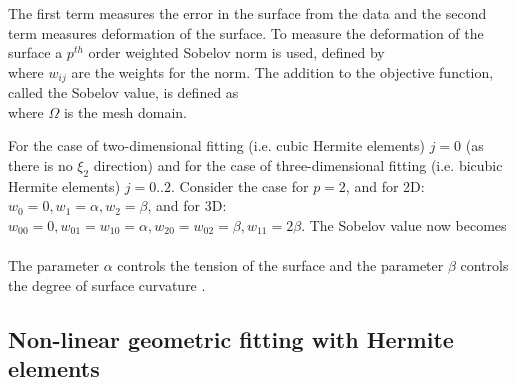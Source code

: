The first term measures the error in the surface from the data and the second
term measures deformation of the surface. To measure the deformation of the
surface a $p^{th}$ order weighted Sobelov norm 
\cite{terzopoulos:1986,tikhonov:1977} is used, defined by
\begin{equation}
  \label{eqn:Sobnorm}
\end{equation}
where $w_{ij}$ are the weights for the norm. The addition to the objective
function, called the Sobelov value, is defined as
\begin{equation}
  \label{eqn:Sobvalue}
\end{equation}
where $\Omega$ is the mesh domain.

For the case of two-dimensional fitting (i.e. cubic Hermite elements) $j=0$
(as there is no $\xi_{2}$ direction) and for the case of three-dimensional
fitting (i.e. bicubic Hermite elements) $j=0..2$. Consider the case for $p=2$,
and for 2D: $w_{0}=0, w_{1}=\alpha, w_{2}=\beta$, and for 3D: $w_{00}=0,
w_{01}=w_{10}=\alpha, w_{20}=w_{02}= \beta, w_{11}=2\beta$. The Sobelov value
now becomes
\begin{equation}
  \begin{array}{lllll}
  \end{array}
  \label{eqn:ptwoSobnorm}
\end{equation}

The parameter $\alpha$ controls the tension of the surface and the parameter
$\beta$ controls the degree of surface curvature
\cite{terzopoulos:1986}.

\subsection{Non-linear geometric fitting with Hermite elements}

